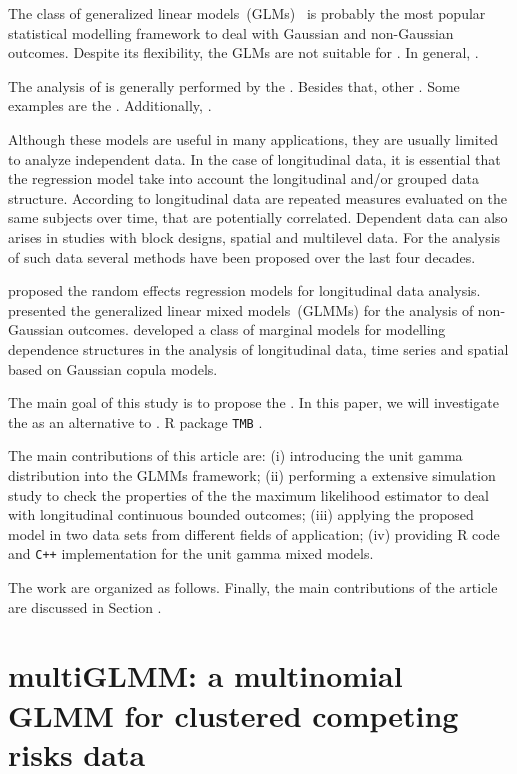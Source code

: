 \documentclass[a4paper,12pt]{article}
\begin{document}
The class of generalized linear models~(GLMs)~\citep{GLM72}
is probably the most popular statistical modelling framework to deal
with Gaussian and non-Gaussian outcomes. Despite its flexibility, the
GLMs are not suitable for . In general, .

The analysis of is generally performed by the . Besides that, other
. Some examples are the . Additionally, .

Although these models are useful in many applications, they are usually
limited to analyze independent data. In the case of longitudinal data,
it is essential that the regression model take into account the
longitudinal and/or grouped data structure. According to \cite{}
longitudinal data are repeated measures evaluated on the same subjects
over time, that are potentially correlated. Dependent data can also
arises in studies with block designs, spatial and multilevel data. For
the analysis of such data several methods have been proposed over the
last four decades.

\cite{laird82} proposed the random effects regression models for
longitudinal data analysis. \cite{breslow93} presented the generalized
linear mixed models~(GLMMs) for the analysis of non-Gaussian
outcomes. \cite{gcmr} developed a class of marginal models for modelling
dependence structures in the analysis of longitudinal data, time series
and spatial based on Gaussian copula models.

The main goal of this study is to propose the . In this paper, we will
investigate the as an alternative to . R \citep{R21} package
\texttt{TMB} \citep{TMb}.

The main contributions of this article are: (i) introducing the unit
gamma distribution into the GLMMs framework; (ii) performing a extensive
simulation study to check the properties of the the maximum likelihood
estimator to deal with longitudinal continuous bounded outcomes; (iii)
applying the proposed model in two data sets from different fields of
application; (iv) providing R code and \texttt{C++} implementation for
the unit gamma mixed models.

The work are organized as follows. Finally, the main contributions of
the article are discussed in Section .

\section{multiGLMM: a multinomial GLMM for clustered competing risks data}
\label{model}
\end{document}
